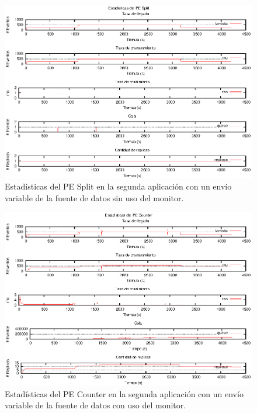\begin{figure}[p]
\centering
    \includegraphics[scale=1.1]{images/exp/app2/normal/sm/statusSplitPE.eps}
    \caption{Estadísticas del PE Split en la segunda aplicación con un envío variable de la fuente de datos sin uso del monitor.}
    \label{fig:app2-normal-statusSplitPE-sm}
\end{figure}

\begin{figure}[p]
\centering
    \includegraphics[scale=1.1]{images/exp/app2/normal/cm/statusCounterPE.eps}
    \caption{Estadísticas del PE Counter en la segunda aplicación con un envío variable de la fuente de datos con uso del monitor.}
    \label{fig:app2-normal-statusCounterPE-cm}
\end{figure}

